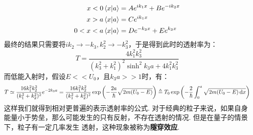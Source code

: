 \begin{align*}
x<0 
& \bra{x}\ket{a} = Ae^{ik_{1}x} + Be^{-ik_{2}x} \\
x>a
& \bra{x}\ket{a} = Ce^{ik_{1}x} \\
0<x<a 
& \bra{x}\ket{a} = De^{-k_{3}x} + Ee^{k_{3}x}
\end{align*}
最终的结果只需要将\(ik_{2}\to -k_{3}, k_{2}^{2}\to -k_{3}^{2}\)，于是得到此时的透射率为：
\[
T = \frac{4k_{1}^{2}k_{3}^{2}}{(k_{3}^{2} + k_{1}^{2})^{2}\sinh^{2}k_{3}a + 4k_{1}^{2}k_{3}^{2}}
\]
而低能入射时，假设\(E<<U_{0}\)，且\(k_{3}a>>1\)时，有：
\[
T \simeq \frac{16k_{1}^{2}k_{2}^{2}}{(k_{1}^{2}+k_{2}^{2})^{2}}e^{-2k_{3}a} = \frac{16k_{1}^{2}k_{2}^{2}}{(k_{1}^{2}+k_{2}^{2})^{2}}\exp\left({-\frac{2a}{\hbar}\sqrt{2m(U_{0}-E)}}\right) \triangleq T_{0}\exp\left({-\frac{2}{\hbar}\int_{0}^{a}\sqrt{2m(U_{0}-E)\dd{x}}}\right)
\]
这样我们就得到相对更普遍的表示透射率的公式. 对于经典的粒子来说，如果自身能量小于势垒，那么可能发生的只有反射，不存在透射的情况. 但是在量子的情景下，粒子有一定几率发生
透射，这种现象被称为\textbf{隧穿效应}. 
